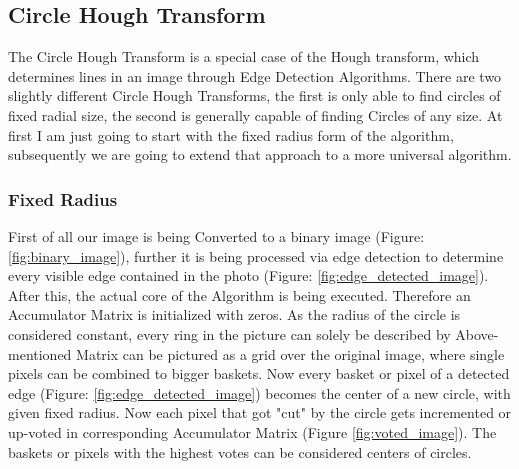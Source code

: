 \subsection{Circle Hough Transform}
The Circle Hough Transform is a special case of the Hough transform, which determines lines in an image through Edge Detection Algorithms. There are two slightly different Circle Hough Transforms, the first is only able to find circles of fixed radial size, the second is generally capable of finding Circles of any size. At first I am just going to start with the fixed radius form of the algorithm, subsequently we are going to extend that approach to a more universal algorithm.

\subsubsection{Fixed Radius}
First of all our image is being Converted to a binary image  (Figure: \ref{fig:binary_image}), further it is being processed via edge detection to determine every visible edge contained in the photo (Figure: \ref{fig:edge_detected_image}).
After this, the actual core of the Algorithm is being executed. Therefore an Accumulator Matrix is initialized with zeros. As the radius of the circle is considered constant, every ring in the picture can solely be described by 
Above-mentioned Matrix can be pictured as a grid over the original image, where single pixels can be combined to bigger baskets. Now every basket or pixel of a detected edge (Figure: \ref{fig:edge_detected_image}) becomes the center of a new circle, with given fixed radius. Now each pixel that got "cut" by the circle gets incremented or up-voted in corresponding Accumulator Matrix (Figure \ref{fig:voted_image}). The baskets or pixels with the highest votes can be considered centers of circles.\newline

